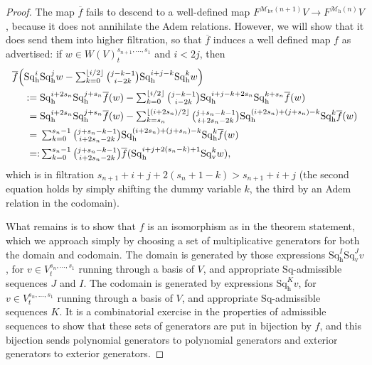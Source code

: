 \documentclass[11pt]{amsart} \renewcommand{\baselinestretch}{1.2}
\theoremstyle{plain}
\numberwithin{equation}{section} %
\theoremstyle{plain}
\numberwithin{equation}{chapter} %
\renewcommand{\to}{\longrightarrow}
\newcommand{\calMh}{\mathcal{M}\dhor}
\newcommand{\calMhv}{\mathcal{M}_\mathrm{hv}}
\newcommand{\Sq}{\mathrm{Sq}}
\newcommand{\dver}{_\mathrm{v}}
\newcommand{\dhor}{_\mathrm{h}}
\newcommand{\Sqh}{\mathrm{Sq}\dhor}
\newcommand{\Sqv}{\mathrm{Sq}\dver}
\begin{document}
\begin{Cohomology Operations for W and U}
\begin{proof}
The map $\overline{f}$ fails to descend to a well-defined map  $F^{\calMhv(n+1)}V\to F^{\calMh(n)}V$, because it does not annihilate the Adem relations. However, we will show that it does send them into higher filtration, so that $\overline{f}$ induces a well defined map $f$ as advertised: if $w\in W(V)^{s_{n+1},\ldots,s_1}_t$ and $i<2j$, then
\begin{alignat*}{2}
\overline{f}\Bigl(\Sqh^i&\Sqh^jw-\textstyle\sum_{k=0}^{\lfloor i/2\rfloor}\binom{j-k-1}{ i-2k}\Sqh^{i+j-k}\Sqh^{k}w\Bigr)\\
{}:={}&\Sqh^{i+2s_n}\Sqh^{j+s_n}\overline{f}(w)-\textstyle\sum_{k=0}^{\lfloor i/2\rfloor}\binom{j-k-1}{ i-2k}\Sqh^{i+j-k+2s_n}\Sqh^{k+s_n}\overline{f}(w)\\
{}={}&
\Sqh^{i+2s_n}\Sqh^{j+s_n}\overline{f}(w)-\textstyle\sum_{k=s_n}^{\lfloor (i+2s_n)/2\rfloor}\binom{j+s_n-k-1}{ i+2s_n-2k}\Sqh^{(i+2s_n)+(j+s_n)-k}\Sqh^{k}\overline{f}(w)\\
{}={}&\textstyle\sum_{k=0}^{s_n-1}\binom{j+s_n-k-1}{ i+2s_n-2k}\Sqh^{(i+2s_n)+(j+s_n)-k}\Sqh^{k}\overline{f}(w)\\
{}=\makebox[0cm][r]{$:$}{}&\textstyle\sum_{k=0}^{s_n-1}\binom{j+s_n-k-1}{ i+2s_n-2k}\overline{f}(\Sqh^{i+j+2(s_n-k)+1}\Sqv^{k}w),
\end{alignat*}
which is in filtration $s_{n+1}+i+j+2(s_n+1-k)>s_{n+1}+i+j$ (the second equation holds by simply shifting the dummy variable $k$, the third by an Adem relation in the codomain).

What remains is to show that $f$ is an isomorphism as in the theorem statement, which we approach simply by choosing a set of multiplicative generators for both the domain and codomain. The domain is generated by those expressions $\Sqh^I\Sqv^Jv$, for $v\in V^{s_{n},\ldots,s_1}_t$ running through a basis of $V$, and appropriate $\Sq$-admissible sequences $J$ and $I$. The codomain is generated by expressions $\Sqh^Kv$, for $v\in V^{s_{n},\ldots,s_1}_t$ running through a basis of $V$, and appropriate $\Sq$-admissible sequences $K$. It is a  combinatorial  exercise in the properties of admissible sequences to show that these sets of generators are put in bijection by $f$, and this bijection sends polynomial generators to polynomial generators and exterior generators to exterior generators.
\end{proof}
\end{Cohomology Operations for W and U}
\end{document}
